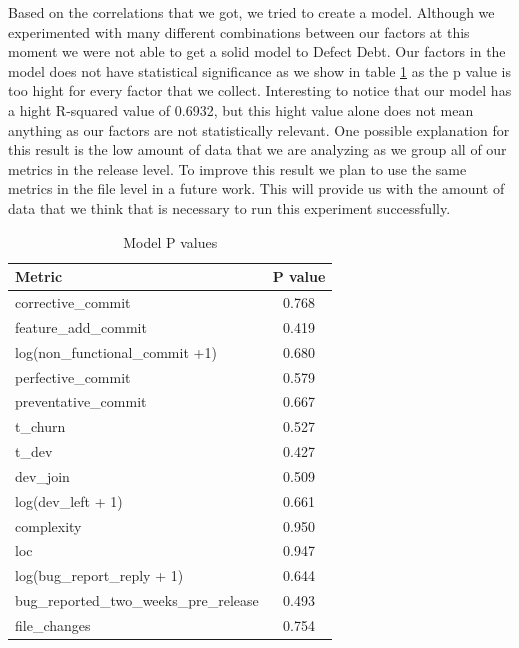 Based on the correlations that we got, we tried to create a model. Although we experimented with many different combinations between our factors at this moment we were not able to get a solid model to Defect Debt. Our factors in the model does not have statistical significance as we show in table \ref{tab:model_p_values}  as the p value is too hight for every factor that we collect. Interesting to notice that our model has a hight R-squared value of 0.6932, but this hight value alone does not mean anything as our factors are not statistically relevant. One possible explanation for this result is the low amount of data that we are analyzing as we group all of our metrics in the release level. To improve this result we plan to use the same metrics in the file level in a future work. This will provide us with the amount of data that we think that is necessary to run this experiment successfully. 

\begin{table}[!hbt]
      \begin{center}
            \caption{Model P values}
            \label{tab:model_p_values}
            \begin{tabular}{l| c}
            \toprule
            \textbf{Metric}  & \textbf{P value} \\ \midrule                                         
            corrective\_commit                      &                     0.768 \\ 
            feature\_add\_commit                     &                    0.419 \\ 
            log(non\_functional\_commit +1)                  &            0.680 \\ 
            perfective\_commit                      &                     0.579 \\ 
            preventative\_commit                    &                     0.667 \\ 
            t\_churn                                &                     0.527 \\ 
            t\_dev                                  &                     0.427 \\ 
            dev\_join                               &                     0.509 \\ 
            log(dev\_left + 1)                               &            0.661 \\ 
            complexity                             &                      0.950 \\ 
            loc                                    &                      0.947 \\ 
            log(bug\_report\_reply + 1)                       &           0.644 \\ 
            bug\_reported\_two\_weeks\_pre\_release     &                 0.493 \\ 
            file\_changes                           &                     0.754 \\  \bottomrule
            \end{tabular}
      \end{center}
\end{table}

